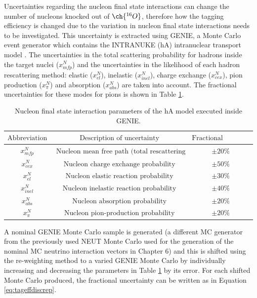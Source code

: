 Uncertainties regarding the nucleon final state interactions can change the number of nucleons knocked out of $\ch{^{16}O}$, therefore how the tagging efficiency is changed due to the variation in nucleon final state interactions needs to be investigated. This uncertainty is extracted using GENIE, a Monte Carlo event generator which contains the INTRANUKE (hA) intranuclear transport model \cite{andreopoulos2010genie}. The uncertainties in the total scattering probability for hadrons inside the target nuclei ($x_{m f p}^{N}$) and the uncertainties in the likelihood of each hadron rescattering method: elastic ($x_{e l}^{N}$), inelastic ($x_{i n e l}^{N}$), charge exchange ($x_{c e x}^{N}$), pion production ($x_{\pi}^{N}$) and absorption ($x_{a b s}^{N}$) are taken into account. The fractional uncertainties for these modes for pions is shown in Table \ref{table:nucleonfsiuncertainties}. 

\begin{table}
\begin{tabular}{||ccc||}
\hline
$\text {Abbreviation}$ & $\text { Description of uncertainty }$  & $\text{Fractional uncertainty}$ \\
\hline
$ x_{m f p}^{N}$ & $\text { Nucleon mean free path (total rescattering probability) }$ & $\pm 20 \%$ \\
$x_{c e x}^{N}$ & $\text { Nucleon charge exchange probability }$ & $\pm 50 \%$ \\
$x_{e l}^{N}$ & $\text { Nucleon elastic reaction probability }$ & $\pm 30 \%$ \\
$x_{i n e l}^{N}$ & $\text { Nucleon inelastic reaction probability }$ & $\pm 40 \%$ \\
$x_{a b s}^{N}$ & $\text { Nucleon absorption probability }$ & $\pm 20 \%$ \\
$x_{\pi}^{N}$ & $\text { Nucleon pion-production probability }$ & $\pm 20 \%$\\
\hline
\end{tabular}
\caption{Nucleon final state interaction parameters of the hA model executed inside GENIE.} 
\label{table:nucleonfsiuncertainties}
\end{table}

A nominal GENIE Monte Carlo sample is generated (a different MC generator from the previously used NEUT Monte Carlo used for the generation of the nominal MC neutrino interaction vectors in Chapter 6) and this is shifted using the re-weighting method to a varied GENIE Monte Carlo by individually increasing and decreasing the parameters in Table \ref{table:nucleonfsiuncertainties} by its error. For each shifted Monte Carlo produced, the fractional uncertainty can be written as in Equation \ref{eq:tageffdiscrep}.

